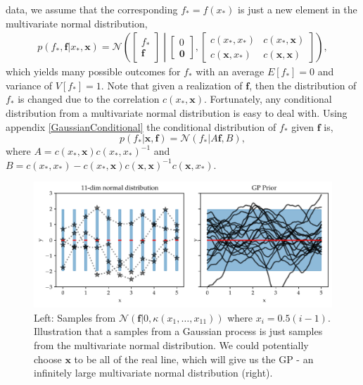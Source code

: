     data, we assume that the corresponding $f_* = f(x_*)$ is just a new element in the multivariate
    normal distribution, 
\begin{align}\label{prior_gp}
    p(f_*,\textbf{f}|x_*,\textbf{x}) = \mathcal{N}\left(\begin{bmatrix}
        f_*\\ \textbf{f}
    \end{bmatrix} \middle| \begin{bmatrix}
        0\\ \textbf{0}
    \end{bmatrix}, \begin{bmatrix}
        c(x_*, x_*) & c(x_*,\textbf{x})\\
        c(\textbf{x}, x_*) & c(\textbf{x}, \textbf{x})
    \end{bmatrix} \right), 
\end{align}
which yields many possible outcomes for $f_*$ with an average $E[f_*] = 0$ and variance of $V[f_*] =
1$. Note that given a realization of $\textbf{f}$, then the distribution of $f_*$ is changed due to
the correlation $c(x_*, \textbf{x})$. Fortunately, any conditional distribution from a multivariate
normal distribution is easy to deal with. Using appendix \ref{GaussianConditional} the
conditional distribution of $f_*$ given $\textbf{f}$ is, 
\begin{equation} \label{conditional_GP}
    p(f_*|\textbf{x}, \textbf{f}) = \mathcal{N}(f_*|A\textbf{f},B),
\end{equation}
where $A = c(x_*, \textbf{x})c(x_*, x_*)^{-1}$ and $B = c(x_*, x_*)-c(x_*, \textbf{x})c(\textbf{x}, \textbf{x})^{-1}c(\textbf{x},x_*)$.
\begin{figure}
    \centering
    \includegraphics[width = \textwidth]{Pictures/GP_samples_mattern.pdf}
    \caption{Left: Samples from $\mathcal{N}(\textbf{f}|0,\kappa(x_1,\dots, x_{11}))$ where
    $x_i= 0.5(i-1)$. Illustration that a samples from a Gaussian process is just
    samples from the multivariate normal distribution. We could potentially choose
    $\textbf{x}$ to be all of the real line, which will give us the GP - an infinitely
    large multivariate normal distribution (right).}
    \label{GP_illustration}
\end{figure}

